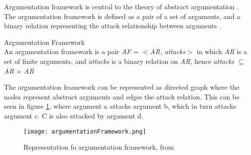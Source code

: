 Argumentation framework is central to the theory of abstract argumentation \cite{baroni2011introduction}. The argumentation framework is defined as a pair of a set of arguments, and a binary relation representing the attack relationship between arguments \cite{dung1995}. 

\theoremstyle{definition}
\begin{definition}{Argumentation Framework}\\
An argumentation framework is a pair \textit{AF} = $<$\textit{AR, attacks}$>$ in which \textit{AR} is a set of finite arguments, and \textit{attacks} is a binary relation on \textit{AR}, hence \textit{attacks} $\subseteq$ \textit{AR} $\times$ \textit{AR}
\end{definition}

The argumentation framework can be represented as directed graph where the nodes represent abstract arguments and edges the attack relation. This can be seen in figure \ref{fig:argumentationFrameworkFigure}, where argument a attacks argument b, which in turn attacks argument c. C is also attacked by argument d.

\begin{figure}[h]
	\centering
	\texttt{[image: argumentationFramework.png]}
	\caption{Representation fo argumentation framework, from \cite{argumentationFrameworkExample}}
	\label{fig:argumentationFrameworkFigure}
\end{figure}

